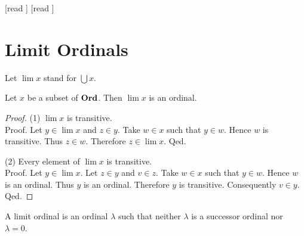 \documentclass[10pt]{article}
\begin{document}
  \begin{imports}
    \begin{forthel}
      [read ]
      [read ]
    \end{forthel}
  \end{imports}


  \section*{Limit Ordinals}

  \begin{forthel}
    Let $\lim x$ stand for $\bigcup x$.
  \end{forthel}

  \begin{forthel}
    \begin{proposition}[id=SET_THEORY_02_7202164443185152,printid]
      Let $x$ be a subset of $\textbf{Ord}$.
      Then $\lim x$ is an ordinal.
    \end{proposition}
    \begin{proof}
      (1) $\lim x$ is transitive. \\
      Proof.
        Let $y \in \lim x$ and $z \in y$.
        Take $w \in x$ such that $y \in w$.
        Hence $w$ is transitive.
        Thus $z \in w$.
        Therefore $z \in \lim x$.
      Qed.

      (2) Every element of $\lim x$ is transitive. \\
      Proof.
        Let $y \in \lim x$.
        Let $z \in y$ and $v \in z$.
        Take $w \in x$ such that $y \in w$.
        Hence $w$ is an ordinal.
        Thus $y$ is an ordinal.
        Therefore $y$ is transitive.
        Consequently $v \in y$.
      Qed.
    \end{proof}
  \end{forthel}

  \begin{forthel}
    \begin{definition}[id=SET_THEORY_02_7678388934279168,printid]
      A limit ordinal is an ordinal $\lambda$ such that neither $\lambda$ is a successor ordinal nor $\lambda = 0$.
    \end{definition}
  \end{forthel}
\end{document}

